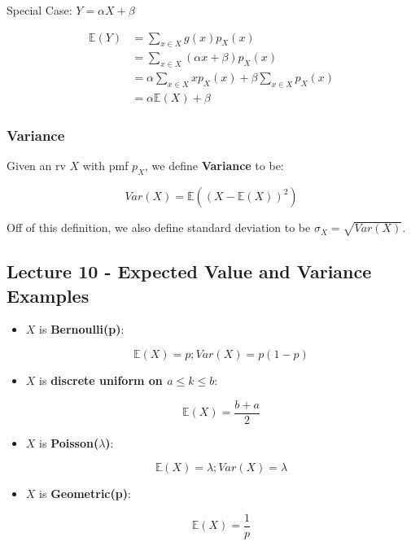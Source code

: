 \documentclass{article}
\begin{document}
Special Case: $Y = \alpha X + \beta$

\[
  \begin{aligned}
    \mathbb{E}(Y)
    &= \sum\limits_{x \in X} g(x) p_X(x) \\
    &= \sum\limits_{x \in X} (\alpha x + \beta) p_X(x) \\
    &= \alpha \sum\limits_{x \in X} x p_X(x) + \beta \sum\limits_{x
      \in X} p_X(x) \\
    &= \alpha \mathbb{E}(X) + \beta
    
  \end{aligned}
\]

\subsubsection{Variance}

Given an rv $X$ with pmf $p_X$, we define \textbf{Variance} to be:

\begin{equation}
  \tag{Variance Def}
  \boxed{
    Var(X) = \mathbb{E}((X - \mathbb{E}(X))^2)
  }
\end{equation}

Off of this definition, we also define standard deviation to be
$\sigma_X = \sqrt{Var(X)}$.


\medskip\hline
\subsection{Lecture 10 - Expected Value and Variance Examples}

\begin{itemize}
\item $X$ is \textbf{Bernoulli(p)}:

  \[
    \mathbb{E}(X) = p; Var(X) = p(1 - p)
  \]

\item $X$ is \textbf{discrete uniform on $a \le k \le b$}:

  \[
    \mathbb{E}(X) = \frac{b + a}{2}
  \]
  
\item $X$ is \textbf{Poisson($\lambda$)}:

  \[
    \mathbb{E}(X) = \lambda; Var(X) = \lambda
  \]

\item $X$ is \textbf{Geometric(p)}:

  \[
    \mathbb{E}(X) = \frac{1}{p}
  \]
\end{itemize}
\end{document}
